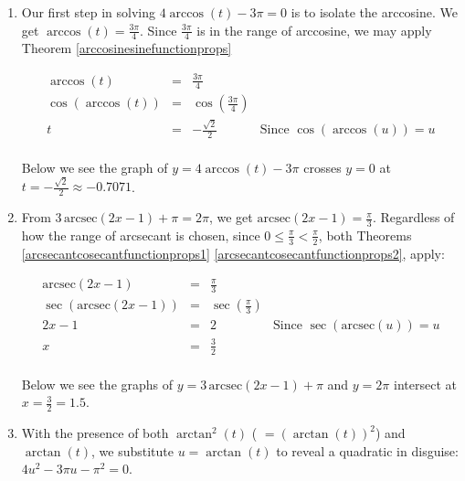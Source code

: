 \documentclass{ximera}
\begin{document}
\begin{example}
\begin{explanation}
\begin{enumerate}
\item Our first step in solving $4\arccos(t)-3\pi = 0$ is to isolate the arccosine. We get $\arccos(t) = \frac{3\pi}{4}$.  Since $\frac{3\pi}{4}$ is in the range of arccosine, we may apply Theorem \ref{arccosinesinefunctionprops}

\[ \begin{array}{rclr}

\arccos(t) & = & \frac{3\pi}{4} & \\
\cos\left(\arccos(t)\right) & = & \cos\left(\frac{3\pi}{4}\right) & \\
t & = & -\frac{\sqrt{2}}{2} & \text{Since $\cos(\arccos(u)) = u$} \\ \end{array} \]


Below we see the graph of $y = 4\arccos(t) - 3\pi$ crosses $y = 0$ at $t=-\frac{\sqrt{2}}{2} \approx -0.7071$.

\begin{center}
\end{center}


\item From $3 \, \text{arcsec}(2x-1) + \pi = 2 \pi$, we get $\text{arcsec}(2x-1) = \frac{\pi}{3}$.  Regardless of how the range of arcsecant is chosen,  since $0 \leq \frac{\pi}{3} < \frac{\pi}{2}$, both Theorems \ref{arcsecantcosecantfunctionprops1}  \ref{arcsecantcosecantfunctionprops2}, apply:

\[ \begin{array}{rclr}

\text{arcsec}(2x-1)& = & \frac{\pi}{3} & \\
\sec(\text{arcsec}(2x-1)) & = & \sec\left(\frac{\pi}{3}\right) & \\
2x -1 & = & 2 & \text{Since $\sec(\text{arcsec}(u)) = u$} \\
    x & = & \frac{3}{2} \\ \end{array} \]

Below we see the graphs of $y=3 \, \text{arcsec}(2x-1) + \pi$ and  $y = 2\pi$ intersect at $x=\frac{3}{2} = 1.5$.

\begin{center}
\end{center}

\item  With the presence of both $\arctan^{2}(t)$ ( $= (\arctan(t))^2$) and $\arctan(t)$, we substitute $u = \arctan(t)$ to reveal a quadratic in disguise:  $4u^2 -3\pi u - \pi^2 = 0$.  


\end{enumerate}
\end{explanation}
\end{example}
\end{document}
